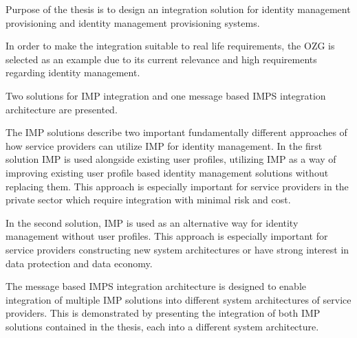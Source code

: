 Purpose of the thesis is to design an integration solution for identity management provisioning and identity management provisioning systems. 

In order to make the integration suitable to real life requirements, the OZG is selected as an example due to its current relevance and high requirements regarding identity management.

Two solutions for IMP integration and one message based IMPS integration architecture are presented.

The IMP solutions describe two important fundamentally different approaches of how service providers can utilize IMP for identity management. In the first solution IMP is used alongside existing user profiles, utilizing IMP as a way of improving existing user profile based identity management solutions without replacing them. This approach is especially important for service providers in the private sector which require integration with minimal risk and cost.

In the second solution, IMP is used as an alternative way for identity management without user profiles. This approach is especially important for service providers constructing new system architectures or have strong interest in data protection and data economy.

The message based IMPS integration architecture is designed to enable integration of multiple IMP solutions into different system architectures of service providers. This is demonstrated by presenting the integration of both IMP solutions contained in the thesis, each into a different system architecture.